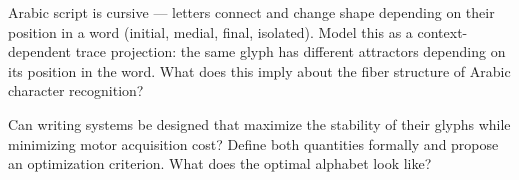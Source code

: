 \begin{exercise}
  Arabic script is cursive — letters connect and change shape depending
  on their position in a word (initial, medial, final, isolated).
  Model this as a context-dependent trace projection: the same glyph
  has different attractors depending on its position in the word.
  What does this imply about the fiber structure of Arabic character recognition?
\end{exercise}

\begin{exercise}[title={Open problem}]
  Can writing systems be designed that maximize the stability of their
  glyphs while minimizing motor acquisition cost? Define both quantities
  formally and propose an optimization criterion. What does the
  optimal alphabet look like?
\end{exercise}
